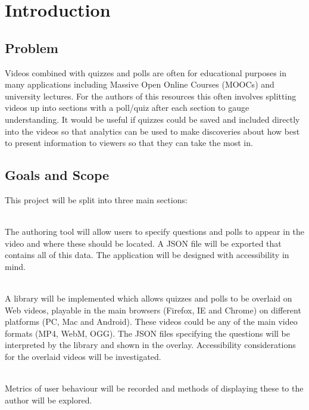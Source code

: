\chapter{Introduction} 
\label{Chapter:Introduction}
\section{Problem} 
\label{Section:Problem}
Videos combined with quizzes and polls are often for educational purposes in many applications including Massive Open Online Courses (MOOCs) and university lectures. For the authors of this resources this often involves splitting videos up into sections with a poll/quiz after each section to gauge understanding. It would be useful if quizzes could be saved and included directly into the videos so that analytics can be used to make discoveries about how best to present information to viewers so that they can take the most in.

\section{Goals and Scope} 
\label{Section:Goals and Scope}
This project will be split into three main sections:
\begin{description}[%
  before={\setcounter{descriptcount}{0}},%
  ,font=\bfseries\stepcounter{descriptcount}\thedescriptcount~]
\item[Quiz Authoring Tool] \hfill \\
The authoring tool will allow users to specify questions and polls to appear in the video and where these should be located. A JSON file will be exported that contains all of this data. The application will be designed with accessibility in mind.
\item[Overlaid Video Player] \hfill \\
A library will be implemented which allows quizzes and polls to be overlaid on Web videos, playable in the main browsers (Firefox, IE and Chrome) on different platforms (PC, Mac and Android). These videos could be any of the main video formats (MP4, WebM, OGG). The JSON files specifying the questions will be interpreted by the library and shown in the overlay. Accessibility considerations for the overlaid videos will be investigated.
\item[Video and Quiz Analytics] \hfill \\
Metrics of user behaviour will be recorded and methods of displaying these to the author will be explored.
\end{description}